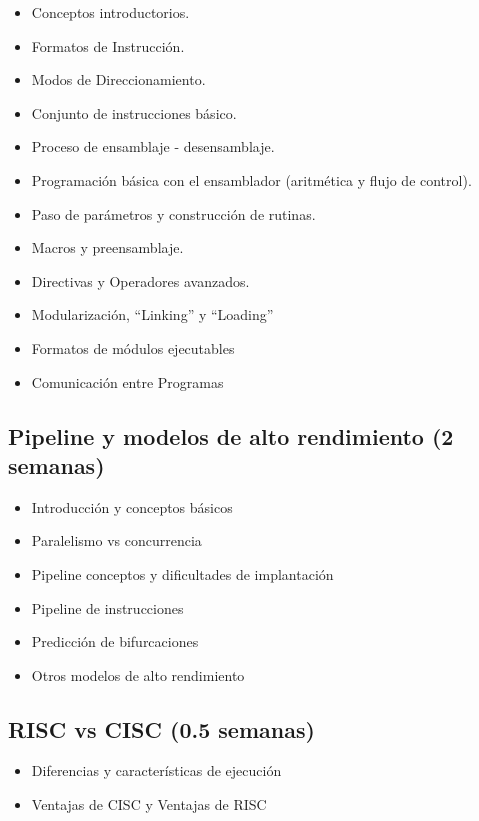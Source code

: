 \documentclass[11pt,fleqn]{report}
\providecommand{\tightlist}{%
	  \setlength{\itemsep}{0pt}\setlength{\parskip}{0pt}}
\begin{document}
\begin{itemize}
\tightlist
\item
  Conceptos introductorios.
\item
  Formatos de Instrucción.
\item
  Modos de Direccionamiento.
\item
  Conjunto de instrucciones básico.
\item
  Proceso de ensamblaje - desensamblaje.
\item
  Programación básica con el ensamblador (aritmética y flujo de
  control).
\item
  Paso de parámetros y construcción de rutinas.
\item
  Macros y preensamblaje.
\item
  Directivas y Operadores avanzados.
\item
  Modularización, ``Linking'' y ``Loading''
\item
  Formatos de módulos ejecutables
\item
  Comunicación entre Programas
\end{itemize}

\subsection{Pipeline y modelos de alto rendimiento (2
semanas)}\label{pipeline-y-modelos-de-alto-rendimiento-2-semanas}

\begin{itemize}
\tightlist
\item
  Introducción y conceptos básicos
\item
  Paralelismo vs concurrencia
\item
  Pipeline conceptos y dificultades de implantación
\item
  Pipeline de instrucciones
\item
  Predicción de bifurcaciones
\item
  Otros modelos de alto rendimiento
\end{itemize}

\subsection{RISC vs CISC (0.5 semanas)}\label{risc-vs-cisc-0.5-semanas}

\begin{itemize}
\tightlist
\item
  Diferencias y características de ejecución
\item
  Ventajas de CISC y Ventajas de RISC
\end{itemize}
\end{document}
